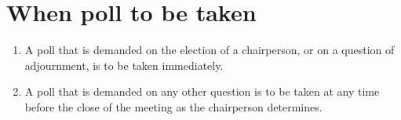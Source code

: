 \section{When poll to be taken}
\label{rule:polls}

\begin{enumerate}
	\item A poll that is demanded on the election of a chairperson, or on a question of adjournment, is to be taken immediately.
	\item A poll that is demanded on any other question is to be taken at any time before the close of the meeting as the chairperson determines.
\end{enumerate}